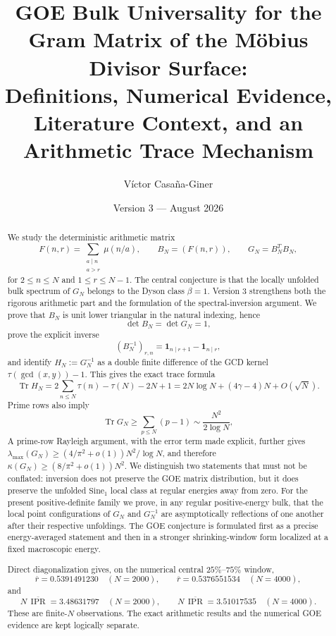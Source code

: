 \documentclass[11pt]{amsart}
\title[GOE Bulk Universality for the M\"obius Divisor Surface]{GOE Bulk Universality for the Gram Matrix of the M\"obius Divisor Surface:\\
Definitions, Numerical Evidence, Literature Context, and an Arithmetic Trace Mechanism}
\author{V\'ictor Casa\~na-Giner}
\date{Version 3 --- August 2026}
\numberwithin{equation}{section}
\theoremstyle{plain}
\theoremstyle{definition}
\theoremstyle{remark}
\newcommand{\mob}{\mu}
\newcommand{\Tr}{\operatorname{Tr}}
\newcommand{\IPR}{\operatorname{IPR}}
\begin{document}
\begin{abstract}
We study the deterministic arithmetic matrix
\begin{equation}
F(n,r)=\sum_{\substack{a\mid n\\ a>r}}\mob(n/a),
\qquad
B_N=(F(n,r)),
\qquad
G_N=B_N^TB_N,
\label{eq:abstract_surface}
\end{equation}
for $2\le n\le N$ and $1\le r\le N-1$.  The central conjecture is that the locally unfolded bulk spectrum of $G_N$ belongs to the Dyson class $\beta=1$.  Version 3 strengthens both the rigorous arithmetic part and the formulation of the spectral-inversion argument.  We prove that $B_N$ is unit lower triangular in the natural indexing, hence
\begin{equation}
\det B_N=\det G_N=1,
\label{eq:abstract_unimodular}
\end{equation}
prove the explicit inverse
\begin{equation}
(B_N^{-1})_{r,n}=\mathbf 1_{n\mid r+1}-\mathbf 1_{n\mid r},
\label{eq:abstract_inverse}
\end{equation}
and identify $H_N:=G_N^{-1}$ as a double finite difference of the GCD kernel $\tau(\gcd(x,y))-1$.  This gives the exact trace formula
\begin{equation}
\Tr H_N
=2\sum_{n\le N}\tau(n)-\tau(N)-2N+1
=2N\log N+(4\gamma-4)N+O(\sqrt N).
\label{eq:abstract_inverse_trace}
\end{equation}
Prime rows also imply
\begin{equation}
\Tr G_N\ge \sum_{p\le N}(p-1)
\sim \frac{N^2}{2\log N},
\label{eq:abstract_trace_lower}
\end{equation}
A prime-row Rayleigh argument, with the error term made explicit, further gives $\lambda_{\max}(G_N)\ge(4/\pi^2+o(1))N^2/\log N$, and therefore $\kappa(G_N)\ge(8/\pi^2+o(1))N^2$.  We distinguish two statements that must not be conflated: inversion does not preserve the GOE matrix distribution, but it does preserve the unfolded $\mathrm{Sine}_1$ local class at regular energies away from zero.  For the present positive-definite family we prove, in any regular positive-energy bulk, that the local point configurations of $G_N$ and $G_N^{-1}$ are asymptotically reflections of one another after their respective unfoldings.  The GOE conjecture is formulated first as a precise energy-averaged statement and then in a stronger shrinking-window form localized at a fixed macroscopic energy.

Direct diagonalization gives, on the numerical central $25\%$--$75\%$ window,
\begin{equation}
\overline r=0.5391491230\quad(N=2000),
\qquad
\overline r=0.5376551534\quad(N=4000),
\label{eq:abstract_gap_ratios}
\end{equation}
and
\begin{equation}
N\,\overline{\IPR}=3.48631797\quad(N=2000),
\qquad
N\,\overline{\IPR}=3.51017535\quad(N=4000).
\label{eq:abstract_ipr}
\end{equation}
These are finite-$N$ observations.  The exact arithmetic results and the numerical GOE evidence are kept logically separate.
\end{abstract}
\end{document}
